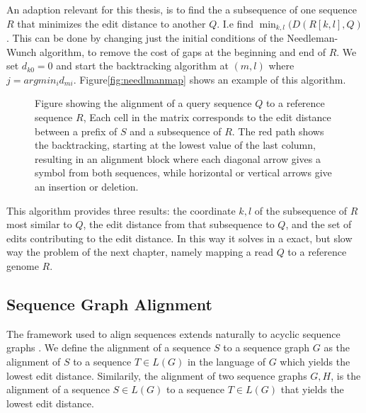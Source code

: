 An adaption relevant for this thesis, is to find the a subsequence of one sequence $R$ that minimizes the edit distance to another $Q$. I.e find $\min_{k, l}(D(R[k, l], Q)$.
This can be done by changing just the initial conditions of the Needleman-Wunch algorithm, to remove the cost of gaps at the beginning and end of $R$. We set $d_{k0} = 0$ and start the backtracking algorithm at $(m, l)$ where $j=arg min_i d_{mi}$. Figure\ref{fig:needlmanmap} shows an example of this algorithm.
\begin{figure}
  \begin{tikzpicture}
    
  \end{tikzpicture}
  \label{fig:needlemanmap}
  \caption{Figure showing the alignment of a query sequence $Q$ to a reference sequence $R$, 
Each cell in the matrix corresponds to the edit distance between a prefix of $S$ and a subsequence of  $R$. The red path shows the backtracking, starting at the lowest value of the last column, resulting in an alignment block where each diagonal arrow gives a symbol from both sequences, while horizontal or vertical arrows give an insertion or deletion.}
\end{figure}
This algorithm provides three results: the coordinate $k, l$ of the subsequence of $R$ most similar to $Q$, the edit distance from that subsequence to $Q$, and the set of edits contributing to the edit distance. In this way it solves in a exact, but slow way the problem of the next chapter, namely mapping a read $Q$ to a reference genome $R$.

\subsection{Sequence Graph Alignment}
The framework used to align sequences extends naturally to acyclic sequence graphs \cite{hein, poa}. We define the alignment of a sequence $S$ to a sequence graph $G$ as the alignment of $S$ to a sequence $T \in L(G)$ in the language of $G$ which yields the lowest edit distance.
Similarily, the alignment of two sequence graphs $G, H$, is the alignment of a sequence $S \in L(G)$ to a sequence $T \in L(G)$ that yields the lowest edit distance. 

